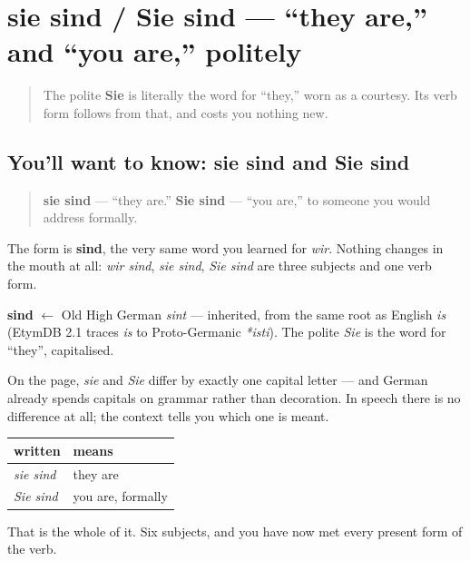 \section[sie sind / Sie sind]{sie sind / Sie sind — \textquotedblleft{}they are,\textquotedblright{} and \textquotedblleft{}you are,\textquotedblright{} politely}

\label{lesson:GE-C16-sie-sind}



\begin{quote}
The polite \textbf{Sie} is literally the word for \textquotedblleft{}they,\textquotedblright{} worn as a courtesy. Its verb form follows from that, and costs you nothing new.
\end{quote}

\subsection*{You'll want to know: sie sind and Sie sind}
\begin{quote}
\textbf{sie sind} — \textquotedblleft{}they are.\textquotedblright{} \textbf{Sie sind} — \textquotedblleft{}you are,\textquotedblright{} to someone you would address formally.
\end{quote}

The form is \textbf{sind}, the very same word you learned for \emph{wir}. Nothing changes in the mouth at all: \emph{wir sind}, \emph{sie sind}, \emph{Sie sind} are three subjects and one verb form.

\begin{cousinweb}
\textbf{sind} $\leftarrow$ Old High German \emph{sint} — inherited, from the same root as English \emph{is} (EtymDB 2.1 traces \emph{is} to Proto-Germanic \emph{*isti}). The polite \emph{Sie} is the word for \textquotedblleft{}they\textquotedblright{}, capitalised.
\end{cousinweb}

\begin{grammarlens}[title={Grammar Lens: the capital carries the politeness}]
On the page, \emph{sie} and \emph{Sie} differ by exactly one capital letter — and German already spends capitals on grammar rather than decoration. In speech there is no difference at all; the context tells you which one is meant.

\noindent
\begin{tabularx}{\linewidth}{@{}>{\raggedright\arraybackslash}X>{\raggedright\arraybackslash}X@{}}
\toprule
\textbf{written} & \textbf{means} \\
\midrule
\emph{sie sind} & they are \\
\emph{Sie sind} & you are, formally \\
\bottomrule
\end{tabularx}

That is the whole of it. Six subjects, and you have now met every present form of the verb.
\end{grammarlens}

